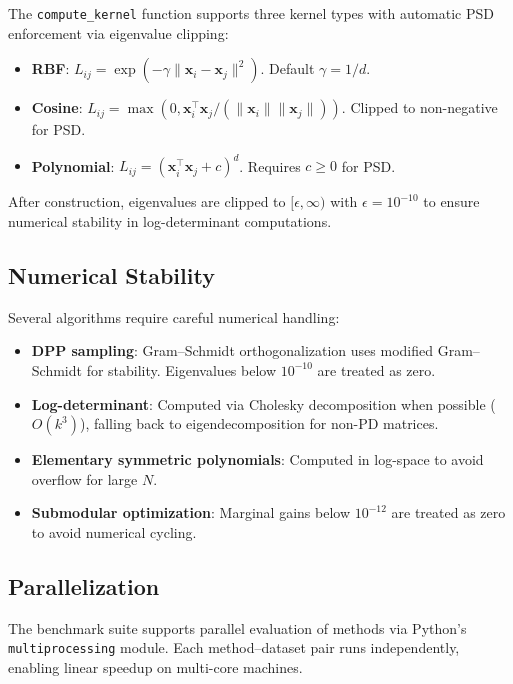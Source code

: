 \documentclass[11pt]{article}
\begin{document}
The \texttt{compute\_kernel} function supports three kernel types with
automatic PSD enforcement via eigenvalue clipping:

\begin{itemize}[leftmargin=*]
\item \textbf{RBF}: $L_{ij} = \exp(-\gamma \|\mathbf{x}_i - \mathbf{x}_j\|^2)$.
  Default $\gamma = 1/d$.
\item \textbf{Cosine}: $L_{ij} = \max(0, \mathbf{x}_i^\top \mathbf{x}_j / (\|\mathbf{x}_i\| \|\mathbf{x}_j\|))$.
  Clipped to non-negative for PSD.
\item \textbf{Polynomial}: $L_{ij} = (\mathbf{x}_i^\top \mathbf{x}_j + c)^d$.
  Requires $c \geq 0$ for PSD.
\end{itemize}

After construction, eigenvalues are clipped to $[\epsilon, \infty)$ with
$\epsilon = 10^{-10}$ to ensure numerical stability in log-determinant
computations.

\subsection{Numerical Stability}

Several algorithms require careful numerical handling:
\begin{itemize}[leftmargin=*]
\item \textbf{DPP sampling}: Gram--Schmidt orthogonalization uses modified
  Gram--Schmidt for stability. Eigenvalues below $10^{-10}$ are treated as zero.
\item \textbf{Log-determinant}: Computed via Cholesky decomposition when
  possible ($O(k^3)$), falling back to eigendecomposition for non-PD matrices.
\item \textbf{Elementary symmetric polynomials}: Computed in log-space to
  avoid overflow for large $N$.
\item \textbf{Submodular optimization}: Marginal gains below $10^{-12}$ are
  treated as zero to avoid numerical cycling.
\end{itemize}

\subsection{Parallelization}

The benchmark suite supports parallel evaluation of methods via Python's
\texttt{multiprocessing} module. Each method--dataset pair runs independently,
enabling linear speedup on multi-core machines.
\end{document}
